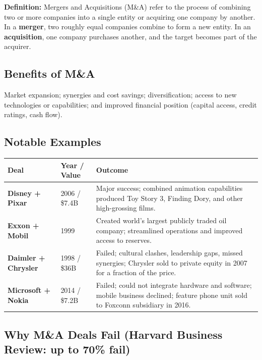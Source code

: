 \documentclass[11pt, letterpaper]{article}
\begin{document}
\begin{defbox}
\textbf{Definition:} Mergers and Acquisitions (M\&A) refer to the process of combining two or more companies into a single entity or acquiring one company by another. In a \textbf{merger}, two roughly equal companies combine to form a new entity. In an \textbf{acquisition}, one company purchases another, and the target becomes part of the acquirer.
\end{defbox}

\subsection{Benefits of M\&A}

Market expansion; synergies and cost savings; diversification; access to new technologies or capabilities; and improved financial position (capital access, credit ratings, cash flow).

\subsection{Notable Examples}

\begin{center}
\begin{tabular}{>{\bfseries}p{3.5cm} p{3cm} p{6cm}}
\toprule
Deal & Year / Value & Outcome \\
\midrule
Disney + Pixar & 2006 / \$7.4B & Major success; combined animation capabilities produced Toy Story 3, Finding Dory, and other high-grossing films. \\
\addlinespace
Exxon + Mobil & 1999 & Created world's largest publicly traded oil company; streamlined operations and improved access to reserves. \\
\addlinespace
Daimler + Chrysler & 1998 / \$36B & Failed; cultural clashes, leadership gaps, missed synergies; Chrysler sold to private equity in 2007 for a fraction of the price. \\
\addlinespace
Microsoft + Nokia & 2014 / \$7.2B & Failed; could not integrate hardware and software; mobile business declined; feature phone unit sold to Foxconn subsidiary in 2016. \\
\bottomrule
\end{tabular}
\end{center}

\subsection{Why M\&A Deals Fail (Harvard Business Review: up to 70\% fail)}
\end{document}
